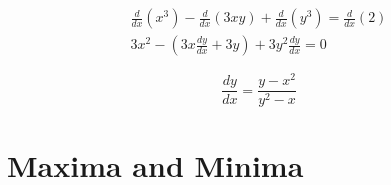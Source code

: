 \begin{align*}
    \frac{d}{dx}(x^3) -  \frac{d}{dx}(3xy) +  \frac{d}{dx}(y^3) =  \frac{d}{dx}(2)\\
    3x^2 - \left(3x\frac{dy}{dx} + 3y\right) + 3y^2\frac{dy}{dx} = 0
\end{align*}

\begin{equation*}
    \frac{dy}{dx} = \frac{y - x^2}{y^2 - x}
\end{equation*}

\section{Maxima and Minima}
